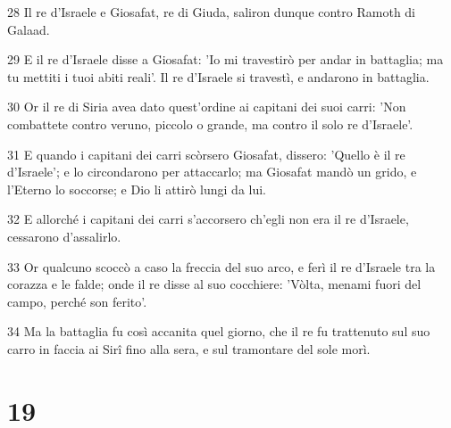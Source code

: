 \par 28 Il re d'Israele e Giosafat, re di Giuda, saliron dunque contro Ramoth di Galaad.
\par 29 E il re d'Israele disse a Giosafat: 'Io mi travestirò per andar in battaglia; ma tu mettiti i tuoi abiti reali'. Il re d'Israele si travestì, e andarono in battaglia.
\par 30 Or il re di Siria avea dato quest'ordine ai capitani dei suoi carri: 'Non combattete contro veruno, piccolo o grande, ma contro il solo re d'Israele'.
\par 31 E quando i capitani dei carri scòrsero Giosafat, dissero: 'Quello è il re d'Israele'; e lo circondarono per attaccarlo; ma Giosafat mandò un grido, e l'Eterno lo soccorse; e Dio li attirò lungi da lui.
\par 32 E allorché i capitani dei carri s'accorsero ch'egli non era il re d'Israele, cessarono d'assalirlo.
\par 33 Or qualcuno scoccò a caso la freccia del suo arco, e ferì il re d'Israele tra la corazza e le falde; onde il re disse al suo cocchiere: 'Vòlta, menami fuori del campo, perché son ferito'.
\par 34 Ma la battaglia fu così accanita quel giorno, che il re fu trattenuto sul suo carro in faccia ai Sirî fino alla sera, e sul tramontare del sole morì.

\chapter{19}

